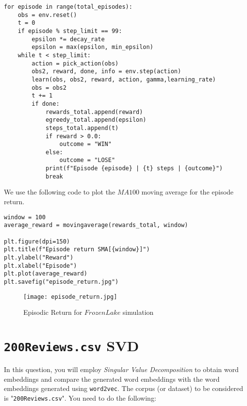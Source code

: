 \documentclass[12pt, letterpaper]{article}
\newcommand{\mybox}[1]{\par\noindent\colorbox{shadecolor}
{\parbox{\dimexpr\textwidth-2\fboxsep\relax}{#1}}}
\begin{document}
\begin{mdframed}[backgroundcolor=shadecolor]
\begin{verbatim}
for episode in range(total_episodes):
    obs = env.reset()
    t = 0
    if episode % step_limit == 99:
        epsilon *= decay_rate
        epsilon = max(epsilon, min_epsilon)
    while t < step_limit:
        action = pick_action(obs)
        obs2, reward, done, info = env.step(action)
        learn(obs, obs2, reward, action, gamma,learning_rate)
        obs = obs2
        t += 1
        if done:            
            rewards_total.append(reward)
            egreedy_total.append(epsilon)
            steps_total.append(t)
            if reward > 0.0:
                outcome = "WIN"                
            else:
                outcome = "LOSE"
            print(f"Episode {episode} | {t} steps | {outcome}")
            break
\end{verbatim}
\end{mdframed}

We use the following code to plot the $MA100$ moving average for the episode return.

\begin{mdframed}[backgroundcolor=shadecolor]
\begin{verbatim}
window = 100
average_reward = movingaverage(rewards_total, window)

plt.figure(dpi=150)
plt.title(f"Episode return SMA[{window}]")
plt.ylabel("Reward")
plt.xlabel("Episode")
plt.plot(average_reward)
plt.savefig("episode_return.jpg")
\end{verbatim}
\end{mdframed}

\begin{figure}[hbt!]
    \caption{Episodic Return for $FrozenLake$ simulation}
    \centering
    \texttt{[image: episode\_return.jpg]}
\end{figure}

\section{\texttt{200Reviews.csv} SVD}

\mybox{In this question, you will employ \textit{Singular Value Decomposition} to obtain word embeddings and compare the generated word embeddings with the word embeddings generated using \texttt{word2vec}. 
The corpus (or dataset) to be considered is "\texttt{200Reviews.csv}". You need to do the following:}
\end{document}
